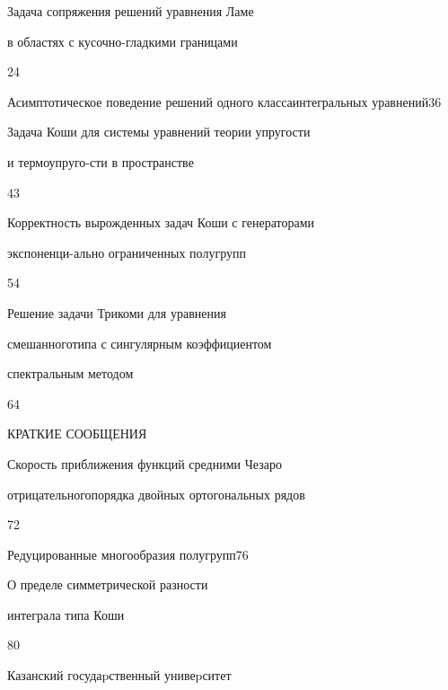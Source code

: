 {Задача сопряжения решений уравнения Ламе 


в областях с кусочно-\newline гладкими границами}{24}




{Асимптотическое поведение решений одного класса\newline интегральных уравнений}{36}




{Задача Коши для системы уравнений теории упругости


и термоупруго-\newline сти в пространстве}{43}




{Корректность вырожденных задач Коши с генераторами  


экспоненци-\newline ально ограниченных полугрупп}{54}




{Решение задачи Трикоми для уравнения


смешанного\newline типа с сингулярным коэффициентом


спектральным методом}{64}


\bigskip





\begin{center}


КРАТКИЕ СООБЩЕНИЯ


\end{center}


\bigskip







{Скорость приближения функций средними Чезаро


отрицательного\newline порядка двойных ортогональных рядов}{72}




{Редуцированные многообразия полугрупп}{76}




{О пределе симметрической разности 


интеграла типа Коши}{80}








\vfill


\noindent\raisebox{2pt}{\copyright} Казанский госудаpственный унивеpситет





